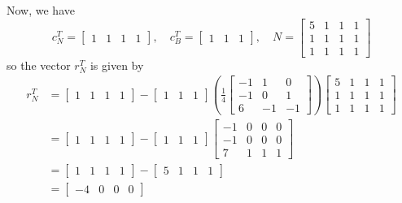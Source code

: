 \documentclass{article}
\begin{document}
\begin{enumerate}
\begin{enumerate}[a)]
\begin{soln}
					Now, we have \[c_N^T = \begin{bmatrix}
							1 & 1 & 1 & 1
						\end{bmatrix}, \quad c_B^T = \begin{bmatrix}
							1 & 1 & 1
						\end{bmatrix}, \quad N=\begin{bmatrix}
							5 & 1 & 1 & 1 \\
							1 & 1 & 1 & 1 \\
							1 & 1 & 1 & 1
					\end{bmatrix}\] so the vector $r_N^T$ is given by
					\begin{align*}
						r_N^T &= \begin{bmatrix}
							1 & 1 & 1 & 1
						\end{bmatrix}-\begin{bmatrix}
							1 & 1 & 1
						\end{bmatrix}\left( \frac{1}{4}\begin{bmatrix}
							-1 & 1 & 0 \\
							-1 & 0 & 1 \\
							6 & -1 & -1
						\end{bmatrix}\right)\begin{bmatrix}
							5 & 1 & 1 & 1 \\
							1 & 1 & 1 & 1 \\
							1 & 1 & 1 & 1
						\end{bmatrix} \\
						&= \begin{bmatrix}
							1 & 1 & 1 & 1
						\end{bmatrix}-\begin{bmatrix}
							1 & 1 & 1
						\end{bmatrix}\begin{bmatrix}
							-1 & 0 & 0 &0 \\
							-1 & 0 & 0 & 0 \\
							7 & 1 & 1 & 1
						\end{bmatrix} \\
						&= \begin{bmatrix}
							1 & 1 & 1 & 1
						\end{bmatrix} - \begin{bmatrix}
							5 & 1 & 1 & 1
						\end{bmatrix} \\
						&= \begin{bmatrix}
							-4 & 0 & 0 & 0
						\end{bmatrix}
					\end{align*}


\end{soln}
\end{enumerate}
\end{enumerate}
\end{document}
